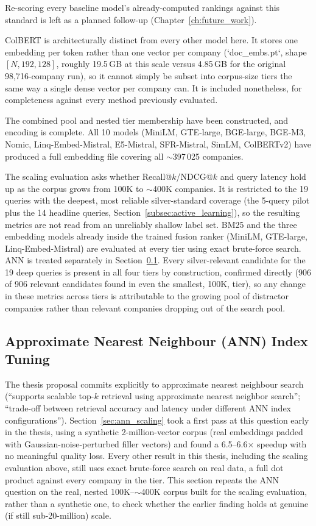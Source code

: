 \documentclass[a4paper,oneside,bibliography=totoc]{scrbook}
\begin{document}
Re-scoring every baseline model's already-computed rankings against this standard is left as a planned follow-up (Chapter~\ref{ch:future_work}).

ColBERT is architecturally distinct from every other model here. It stores one embedding per token rather than one vector per company (`doc\_embs.pt`, shape $[N, 192, 128]$, roughly 19.5\,GB at this scale versus 4.85\,GB for the original 98,716-company run), so it cannot simply be subset into corpus-size tiers the same way a single dense vector per company can. It is included nonetheless, for completeness against every method previously evaluated.

The combined pool and nested tier membership have been constructed, and encoding is complete. All 10 models (MiniLM, GTE-large, BGE-large, BGE-M3, Nomic, Linq-Embed-Mistral, E5-Mistral, SFR-Mistral, SimLM, ColBERTv2) have produced a full embedding file covering all $\sim$397\,025 companies.

The scaling evaluation asks whether Recall@$k$/NDCG@$k$ and query latency hold up as the corpus grows from 100K to $\sim$400K companies. It is restricted to the 19 queries with the deepest, most reliable silver-standard coverage (the 5-query pilot plus the 14 headline queries, Section~\ref{subsec:active_learning}), so the resulting metrics are not read from an unreliably shallow label set. BM25 and the three embedding models already inside the trained fusion ranker (MiniLM, GTE-large, Linq-Embed-Mistral) are evaluated at every tier using exact brute-force search. ANN is treated separately in Section~\ref{subsec:ann_tuning}. Every silver-relevant candidate for the 19 deep queries is present in all four tiers by construction, confirmed directly (906 of 906 relevant candidates found in even the smallest, 100K, tier), so any change in these metrics across tiers is attributable to the growing pool of distractor companies rather than relevant companies dropping out of the search pool.

\subsection{Approximate Nearest Neighbour (ANN) Index Tuning}
\label{subsec:ann_tuning}

The thesis proposal commits explicitly to approximate nearest neighbour search (``supports scalable top-$k$ retrieval using approximate nearest neighbor search''; ``trade-off between retrieval accuracy and latency under different ANN index configurations''). Section~\ref{sec:ann_scaling} took a first pass at this question early in the thesis, using a synthetic 2-million-vector corpus (real embeddings padded with Gaussian-noise-perturbed filler vectors) and found a 6.5--6.6$\times$ speedup with no meaningful quality loss. Every other result in this thesis, including the scaling evaluation above, still uses exact brute-force search on real data, a full dot product against every company in the tier. This section repeats the ANN question on the real, nested 100K--$\sim$400K corpus built for the scaling evaluation, rather than a synthetic one, to check whether the earlier finding holds at genuine (if still sub-20-million) scale.
\end{document}

